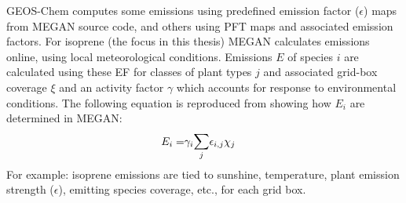     GEOS-Chem computes some emissions using predefined emission factor ($\epsilon$) maps from MEGAN source code, and others using PFT maps and associated emission factors.
    For isoprene (the focus in this thesis) MEGAN calculates emissions online, using local meteorological conditions.
    Emissions $E$ of species $i$ are calculated using these EF for classes of plant types $j$ and associated grid-box coverage $\xi$ and an activity factor $\gamma$ which accounts for response to environmental conditions.
    The following equation is reproduced from \textcite{Guenther2012} showing how $E_i$ are determined in MEGAN: 
    \begin{eqnarray} 
      \label{Model:GC:MEGAN:eqn_emission_factors}
      E_i = & \gamma_i \mathlarger{\sum}_j{\epsilon_{i,j} \chi_j}
    \end{eqnarray}
    For example: isoprene emissions are tied to sunshine, temperature, plant emission strength ($\epsilon$), emitting species coverage, etc., for each grid box.
    
  
